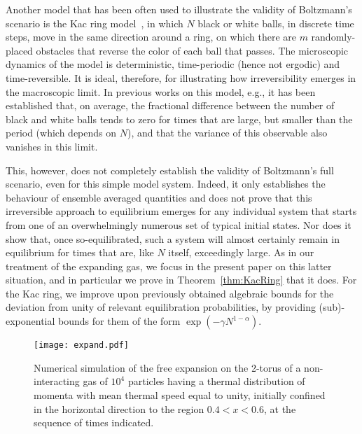 \documentclass{article}
\numberwithin{equation}{section}
\begin{document}
Another model that has been often used to illustrate the validity of Boltzmann's scenario is the
Kac ring model~\cite{Ka59, Th72, Br96,GoOl09, MaNeSh09}, in which $N$ black or white balls, in discrete time
steps,  move in the same direction around a ring, on which there are $m$ randomly-placed obstacles that
reverse the color of each ball that passes.
The microscopic dynamics of the model is deterministic, time-periodic (hence not ergodic) and time-reversible. It is
ideal, therefore, for illustrating how irreversibility emerges in the macroscopic limit.
In previous works on this model, e.g., it has been established that, on average, the fractional difference between the number of black and white balls tends to zero for times that are large, but smaller than the period (which depends on $N$), and that the variance of this observable also vanishes in this limit.

This, however, does not completely establish the validity of Boltzmann's full scenario, even for
this simple model system.
Indeed, it only establishes the behaviour of ensemble averaged quantities and does not prove that this irreversible
approach to equilibrium emerges for any individual system that starts from one of an overwhelmingly numerous set
of typical initial states. Nor does it show that, once so-equilibrated, such a system will almost certainly remain
in equilibrium for times that are, like $N$ itself, exceedingly large. As in our treatment of the expanding gas, we focus in the present paper on this latter situation, and in particular we prove in Theorem~\ref{thm:KacRing} that it does. 
 For the Kac ring, we improve upon previously obtained algebraic bounds for the deviation from unity of relevant equilibration probabilities, by providing (sub)-exponential bounds for them of the form  $\exp (-\gamma N^{1-\alpha})$.

\begin{figure}
\centering
\captionsetup{width=0.85\textwidth}
\texttt{[image: expand.pdf]}
\caption{Numerical simulation of the free expansion on the 2-torus of a non-interacting gas of $10^4$ particles having a thermal distribution of momenta with mean thermal speed equal to unity,  initially confined in the horizontal direction to the region $0.4 <x < 0.6$, at the sequence of times indicated.}
\label{fig:expand}
\end{figure}
\end{document}
